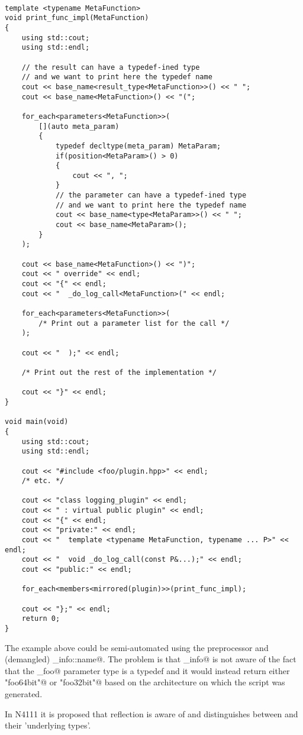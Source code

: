 \begin{verbatim}

template <typename MetaFunction>
void print_func_impl(MetaFunction)
{
	using std::cout;
	using std::endl;

	// the result can have a typedef-ined type
	// and we want to print here the typedef name
	cout << base_name<result_type<MetaFunction>>() << " ";
	cout << base_name<MetaFunction>() << "(";

	for_each<parameters<MetaFunction>>(
		[](auto meta_param)
		{
			typedef decltype(meta_param) MetaParam;
			if(position<MetaParam>() > 0)
			{
				cout << ", ";
			}
			// the parameter can have a typedef-ined type
			// and we want to print here the typedef name
			cout << base_name<type<MetaParam>>() << " ";
			cout << base_name<MetaParam>();
		}
	);

	cout << base_name<MetaFunction>() << ")";
	cout << " override" << endl;
	cout << "{" << endl;
	cout << "  _do_log_call<MetaFunction>(" << endl;

	for_each<parameters<MetaFunction>>(
		/* Print out a parameter list for the call */
	);

	cout << "  );" << endl;

	/* Print out the rest of the implementation */

	cout << "}" << endl;
}

void main(void)
{
	using std::cout;
	using std::endl;

	cout << "#include <foo/plugin.hpp>" << endl;
	/* etc. */

	cout << "class logging_plugin" << endl;
	cout << " : virtual public plugin" << endl;
	cout << "{" << endl;
	cout << "private:" << endl;
	cout << "  template <typename MetaFunction, typename ... P>" << endl;
	cout << "  void _do_log_call(const P&...);" << endl;
	cout << "public:" << endl;

	for_each<members<mirrored(plugin)>>(print_func_impl);

	cout << "};" << endl;
	return 0;
}

\end{verbatim}

The example above could be semi-automated using the preprocessor
and (demangled) \verb@type_info::name@. The problem is that
\verb@type_info@ is not aware of the fact that the \verb@default_foo@
parameter type is a typedef and it would instead return either
\verb@"foo64bit"@ or \verb@"foo32bit"@ based on the architecture
on which the script was generated.

In N4111 it is proposed that reflection is aware of \verb@typedef@s and distinguishes between
\verb@typedef@s and their 'underlying types'.

